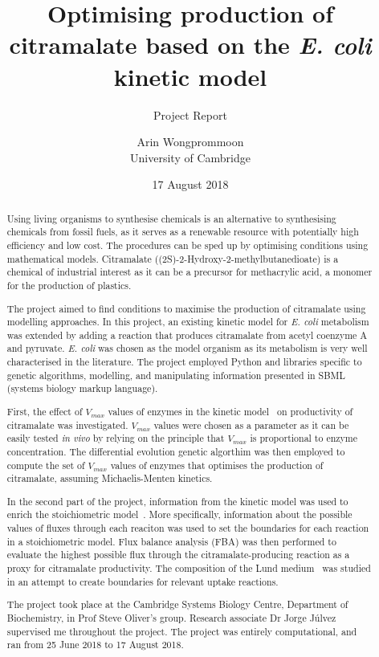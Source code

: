 \documentclass[parskip=full]{scrreprt}
\author{Arin Wongprommoon\\University of Cambridge}
\title{Optimising production of citramalate based on the \emph{E. coli} kinetic model}
\subtitle{Project Report}
\date{17 August 2018}
\begin{document}
\maketitle

\tableofcontents

\begin{abstract}
  Using living organisms to synthesise chemicals is an alternative to synthesising chemicals from fossil fuels, as it serves as a renewable resource with potentially high efficiency and low cost. The procedures can be sped up by optimising conditions using mathematical models. Citramalate ((2S)-2-Hydroxy-2-methylbutanedioate) is a chemical of industrial interest as it can be a precursor for methacrylic acid, a monomer for the production of plastics. 
  
  The project aimed to find conditions to maximise the production of citramalate using modelling approaches. In this project, an existing kinetic model for \emph{E. coli} metabolism was extended by adding a reaction that produces citramalate from acetyl coenzyme A and pyruvate. \emph{E. coli} was chosen as the model organism as its metabolism is very well characterised in the literature. The project employed Python and libraries specific to genetic algorithms, modelling, and manipulating information presented in SBML (systems biology markup language).
  
  First, the effect of $V_{max}$ values of enzymes in the kinetic model~\cite{millard_metabolic_2017} on productivity of citramalate was investigated. $V_{max}$ values were chosen as a parameter as it can be easily tested \emph{in vivo} by relying on the principle that $V_{max}$ is proportional to enzyme concentration. The differential evolution genetic algorthim was then employed to compute the set of $V_{max}$ values of enzymes that optimises the production of citramalate, assuming Michaelis-Menten kinetics.
  
  In the second part of the project, information from the kinetic model was used to enrich the stoichiometric model~\cite{orth_comprehensive_2011}. More specifically, information about the possible values of fluxes through each reaciton was used to set the boundaries for each reaction in a stoichiometric model. Flux balance analysis (FBA) was then performed to evaluate the highest possible flux through the citramalate-producing reaction as a proxy for citramalate productivity. The composition of the Lund medium~\cite{eastham_process_2015} was studied in an attempt to create boundaries for relevant uptake reactions.
  
  The project took place at the Cambridge Systems Biology Centre, Department of Biochemistry, in Prof Steve Oliver's group. Research associate Dr Jorge J\'ulvez supervised me throughout the project. The project was entirely computational, and ran from 25 June 2018 to 17 August 2018.
\end{abstract}
\end{document}
